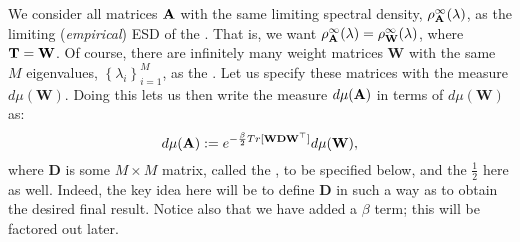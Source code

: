We consider all matrices $\mathbf{\mathbf{A}}$ with the same limiting spectral density, $\rho_{\mathbf{A}}^{\infty}(\lambda)$,
as the limiting (\emph{empirical}) ESD of the \Teacher.
That is, we want $\rho_{\mathbf{A}}^{\infty}(\lambda)=\rho^{\infty}_{{\mathbf{W}}}(\lambda)$, where ${\mathbf{T}}={\mathbf{W}}$.
Of course, there are infinitely many weight matrices $\mathbf{W}$ with the same $M$ eigenvalues, $\left\{ \lambda_{i} \right\}_{i=1}^{M}$, as the \Teacher.
Let us specify these matrices with the measure $d\mu(\mathbf{W})$.
Doing this lets us then write the measure $d\mu(\mathbf{\mathbf{A}})$ in terms of $d\mu(\mathbf{W})$ as:
\begin{equation}
\label{eqn:dmuA}
d\mu(\mathbf{\mathbf{A}}) 
   := e^{- \frac{\beta}{2} Tr[\mathbf{W}\mathbf{D}\mathbf{W}^{\top}]} d\mu(\mathbf{W})  ,
\end{equation}
where $\mathbf{D}$ is some $M \times M$ matrix, called the \SourceMatrix, to be specified below,
and the $\tfrac{1}{2}$ here as well.
Indeed, the key idea here will be to define $\mathbf{D}$ in such a way as to obtain the desired final result.
Notice also that we have added a $\beta$ term; this will be factored out later.


